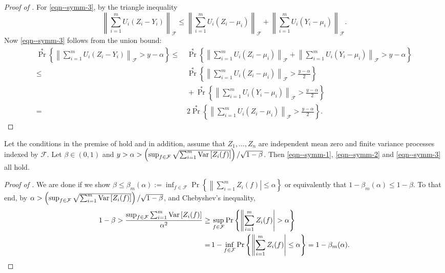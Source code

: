 \begin{proof}[Proof of ]
For \eqref{eqn--symm-3}, by the triangle inequality
\begin{equation*}
  \left\| \sum_{i = 1}^{m} U_{i} \left( Z_{i} - Y_{i} \right)
  \right\|_{\mathcal{F}} \leq \left\| \sum_{i = 1}^{m} U_{i} \left( Z_{i} -
  \mu_{i} \right) \right\|_{\mathcal{F}} + \left\| \sum_{i = 1}^{m} U_{i} \left(
  Y_{i} - \mu_{i} \right) \right\|_{\mathcal{F}}.
\end{equation*}
Now \eqref{eqn--symm-3} follows from the union bound:
\begin{align*}
  \Pr^{\ast} \left\{ \left\| \sum_{i = 1}^{m} U_{i} \left( Z_{i} - Y_{i}
  \right) \right\|_{\mathcal{F}} > y - \alpha \right\} \leq
  & \, \Pr^{\ast} \left\{ \left\| \sum_{i = 1}^{m} U_{i} \left( Z_{i} -
  \mu_{i} \right) \right\|_{\mathcal{F}} + \left\| \sum_{i = 1}^{m} U_{i} \left(
  Y_{i} - \mu_{i} \right) \right\|_{\mathcal{F}} > y - \alpha \right\} \\
  \leq
  & \, \Pr^{\ast} \left\{ \left\| \sum_{i = 1}^{m} U_{i} \left(
  Z_{i} - \mu_{i} \right) \right\|_{\mathcal{F}} > \frac{y - \alpha}{2} \right\}
  \\
  & \, + \Pr^{\ast} \left\{ \left\| \sum_{i = 1}^{m} U_{i} \left( Y_{i} -
  \mu_{i} \right) \right\|_{\mathcal{F}} > \frac{y - \alpha}{2} \right\} \\
  =
  & \, 2 \Pr^{\ast} \left\{ \left\| \sum_{i = 1}^{m} U_{i} \left( Z_{i} -
  \mu_{i} \right) \right\|_{\mathcal{F}} > \frac{y - \alpha}{2} \right\}.
\end{align*}
\end{proof}

\begin{lemma}
\label{lem--symm-2}
Let the conditions in the premise of  hold and in addition,
assume that \(Z_{1}, \dots, Z_{n}\) are independent mean zero and finite
variance processes indexed by \(\mathcal{F}\).
Let \(\beta \in (0, 1)\) and \(y > \alpha > \left( \sup_{f \in \mathcal{F}}
\sqrt{\sum_{i = 1}^{m} \mathrm{Var} \left[ Z_{i} (f) \right]} \right) / \sqrt{1 -
\beta}\).
Then \eqref{eqn--symm-1}, \eqref{eqn--symm-2} and \eqref{eqn--symm-3} all hold.
\end{lemma}

\begin{proof}[Proof of ]
We are done if we show \(\beta \leq \beta_{m} (\alpha) := \inf_{f \in
\mathcal{F}} \Pr \left\{ \left\| \sum_{i = 1}^{m} Z_{i} (f) \right| \leq \alpha
\right\}\) or equivalently that \(1 - \beta_{m} (\alpha) \leq 1 - \beta\).
To that end, by \(\alpha > \left( \sup_{f \in \mathcal{F}} \sqrt{\sum_{i =
1}^{m} \mathrm{Var} \left[ Z_{i} (f) \right]} \right) / \sqrt{1 - \beta}\),
and Chebyshev's inequality,
\begin{align*}
  1 - \beta > \frac{\sup_{f \in \mathcal{F}} \sum_{i = 1}^{m} \mathrm{Var} \left[ Z_{i}
  (f) \right]}{\alpha^{2}} \geq
  & \, \sup_{f \in \mathcal{F}} \mathrm{Pr} \left\{ \left\|
  \sum_{i = 1}^{m} Z_{i} (f) \right| > \alpha \right\} \\
  =
  & \, 1 - \inf_{f \in \mathcal{F}} \mathrm{Pr} \left\{ \left\| \sum_{i = 1}^{m} Z_{i}
  (f) \right| \leq \alpha \right\} = 1 - \beta_{m} (\alpha).
\end{align*}
\end{proof}

